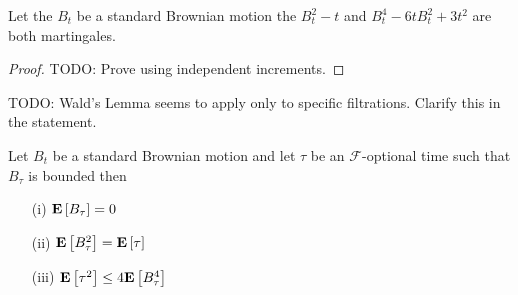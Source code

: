 \begin{lem}Let the $B_t$ be a standard Brownian motion the $B_t^2 - t$
  and $B_t^4 - 6tB_t^2 + 3t^2$ are both martingales.
\end{lem}
\begin{proof}
TODO: Prove using independent increments.
\end{proof}

TODO: Wald's Lemma seems to apply only to specific filtrations.
Clarify this in the statement.

\begin{lem}\label{WaldLemma}Let $B_t$ be a standard
  Brownian motion and let $\tau$ be an $\mathcal{F}$-optional time
 such that $B_\tau$ is bounded then
\begin{itemize}
\item[(i)]$\textbf{E}\left[B_\tau\right] = 0$
\item[(ii)]$\textbf{E}\left[B_\tau^2\right] = \textbf{E}\left[\tau\right]$
\item[(iii)]$\textbf{E}\left[\tau^2\right] \leq 4\textbf{E}\left[B_\tau^4\right]$
\end{itemize}
\end{lem}
